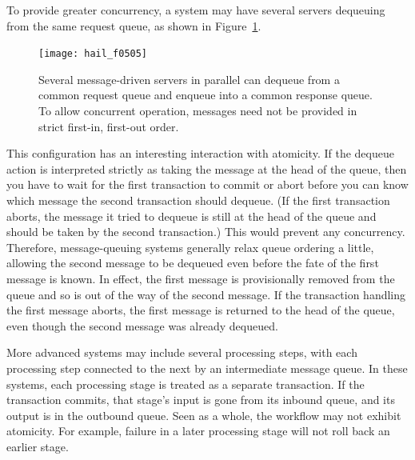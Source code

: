 To provide greater concurrency, a system may have several servers
dequeuing from the same request queue, as shown in
Figure~\ref{scan-5-5}.
\begin{figure}
\centerline{\texttt{[image: hail\_f0505]}}
\caption{Several message-driven servers in parallel can dequeue from a
  common request queue and enqueue into a common response queue.  To
  allow concurrent operation, messages need not be provided in strict
  first-in, first-out order.}
\label{scan-5-5}
\end{figure}
This configuration has an interesting
interaction with atomicity.  If the dequeue action is interpreted
strictly as taking the message at the head of the queue, then you have
to wait for the first transaction to commit or abort before you can
know which message the second transaction should dequeue.  (If the
first transaction aborts, the message it tried to dequeue is still at
the head of the queue and should be taken by the second
transaction.)  This would prevent any concurrency.  Therefore,
message-queuing systems generally relax queue ordering a little,
allowing the second message to be dequeued even before the fate of the
first message is known.  In effect, the first message is provisionally
removed from the queue and so is out of the way of the second
message.  If the transaction handling the first
message aborts, the first message is returned to the head of the queue, even though the
second message was already dequeued.

More advanced  systems may include
several processing steps, with each processing step connected to the
next by an intermediate message queue. In these systems, each
processing stage is treated as a separate transaction.  If the
transaction commits, that stage's input is gone from its inbound
queue, and its output is in the outbound queue.  Seen as a whole, the
workflow may not exhibit atomicity.  For example, failure in a later
processing stage will not roll back an earlier stage.

